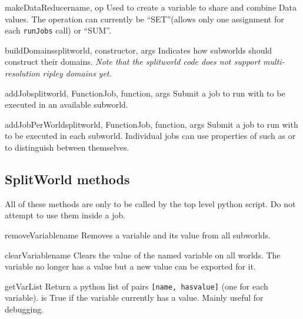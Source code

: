 \begin{funcdesc}{makeDataReducer}{name, op}
Used to create a variable to share and combine Data values.
The operation can currently be ``SET''(allows only one assignment for each \texttt{runJobs} call) or ``SUM''.
\end{funcdesc}

\begin{funcdesc}{buildDomains}{splitworld, constructor, args}
Indicates how subworlds should construct their domains.
\emph{Note that the splitworld code does not support multi-resolution ripley domains yet.}
\end{funcdesc}

\begin{funcdesc}{addJob}{splitworld, FunctionJob, function, args}
Submit a job to run  with  to be executed in an available subworld.
\end{funcdesc}

\begin{funcdesc}{addJobPerWorld}{splitworld, FunctionJob, function, args}
Submit a job to run  with  to be executed in each subworld.
Individual jobs can use properties of  such as  or  to distinguish between
themselves.
\end{funcdesc}

\subsection{SplitWorld methods}
All of these methods are only to be called by the top level python script.
Do not attempt to use them inside a job.

\begin{methoddesc}[SplitWorld]{removeVariable}{name}
Removes a variable and its value from all subworlds.
\end{methoddesc}

\begin{methoddesc}[SplitWorld]{clearVariable}{name}
Clears the value of the named variable on all worlds.
The variable no longer has a value but a new value can be exported for it.
\end{methoddesc}

\begin{methoddesc}[SplitWorld]{getVarList}{}
Return a python list of pairs \texttt{[name, hasvalue]} (one for each variable).
 is True if the variable currently has a value.
Mainly useful for debugging.
\end{methoddesc}

